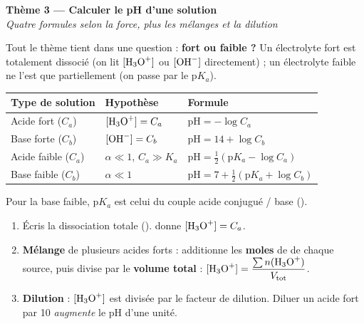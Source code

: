 \documentclass[11pt,a4paper]{article}
\begin{document}

\begin{center}
{\LARGE\bfseries\color{primarydark} Thème 3 — Calculer le pH d'une solution}\\[2pt]
{\color{primary}\itshape Quatre formules selon la force, plus les mélanges et la dilution}
\end{center}

\medskip
Tout le thème tient dans une question : \textbf{fort ou faible ?} Un électrolyte fort est totalement dissocié
(on lit $[\ce{H3O+}]$ ou $[\ce{OH-}]$ directement) ; un électrolyte faible ne l'est que partiellement (on passe
par le $\mathrm{p}K_a$).

\begin{cle}
\begin{center}\small
\begin{tabular}{lll}
\toprule
\textbf{Type de solution} & \textbf{Hypothèse} & \textbf{Formule} \\
\midrule
Acide fort ($C_a$)   & $[\ce{H3O+}] = C_a$              & $\mathrm{pH} = -\log C_a$ \\
Base forte ($C_b$)   & $[\ce{OH-}] = C_b$              & $\mathrm{pH} = 14 + \log C_b$ \\
Acide faible ($C_a$) & $\alpha \ll 1$, $C_a \gg K_a$    & $\mathrm{pH} = \tfrac12(\mathrm{p}K_a - \log C_a)$ \\
Base faible ($C_b$)  & $\alpha \ll 1$                   & $\mathrm{pH} = 7 + \tfrac12(\mathrm{p}K_a + \log C_b)$ \\
\bottomrule
\end{tabular}
\end{center}
Pour la base faible, $\mathrm{p}K_a$ est celui du couple acide conjugué / base ().
\end{cle}

\begin{methode}
\begin{enumerate}[leftmargin=1.5em,topsep=2pt,itemsep=1.5pt]
  \item Écris la dissociation totale (\ce{->}).  donne $[\ce{H3O+}] = C_a$.
  \item \textbf{Mélange} de plusieurs acides forts : additionne les \textbf{moles} de  de chaque
        source, puis divise par le \textbf{volume total} : $[\ce{H3O+}] = \dfrac{\sum n(\ce{H3O+})}{V_{\text{tot}}}$.
  \item \textbf{Dilution} : $[\ce{H3O+}]$ est divisée par le facteur de dilution. Diluer un acide fort par
        \num{10} \emph{augmente} le pH d'une unité.
\end{enumerate}
\end{methode}
\end{document}
